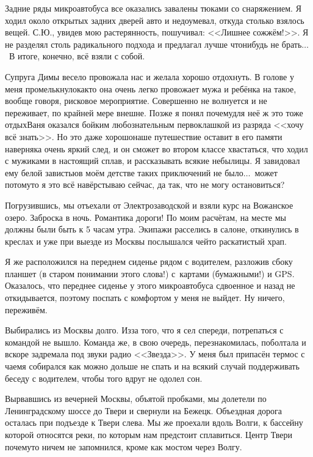 Задние ряды микроавтобуса все оказались завалены тюками со снаряжением. Я ходил около открытых задних дверей авто и недоумевал, откуда столько взялось вещей. С.Ю., увидев мою растерянность, пошучивал:  <<Лишнее сожжём!>>. Я не разделял столь радикального подхода и предлагал лучше что\sdash нибудь не брать$\ldots$~В итоге, конечно, всё взяли с собой.

Супруга Димы весело провожала нас и желала хорошо отдохнуть. В голове у меня промелькнуло\mdash как\sdash то она очень легко провожает мужа и ребёнка на такое, вообще говоря, рисковое мероприятие. Совершенно не волнуется и не переживает, по крайней мере внешне. Позже я понял почему\mdash для неё ж это тоже отдых\mdash Ваня оказался бойким любознательным первоклашкой из разряда <<хочу всё знать>>. Но это даже хорошо\mdash наше путешествие оставит в его памяти наверняка очень яркий след, и он сможет во втором классе хвастаться, что ходил с мужиками в настоящий сплав, и рассказывать всякие небылицы. Я завидовал ему белой завистью\mdash в моём детстве таких приключений не было$\ldots$~может потому\sdash то я это всё навёрстываю сейчас, да так, что не могу остановиться?

Погрузившись, мы отъехали от Электрозаводской и взяли курс на Вожанское озеро. Заброска в ночь. Романтика дороги! По моим расчётам, на месте мы должны были быть к 5 часам утра. Экипажи расселись в салоне, откинулись в креслах и уже при выезде из Москвы послышался чей\sdash то раскатистый храп.

Я же расположился на переднем сиденье рядом с водителем, разложив сбоку планшет (в старом понимании этого слова!) с~картами (бумажными!) и GPS. Оказалось, что переднее сиденье у этого микроавтобуса сдвоенное и назад не откидывается, поэтому поспать с комфортом у меня не выйдет. Ну ничего, переживём. 

Выбирались из Москвы долго. Из\sdash за того, что я сел спереди, потрепаться с командой не вышло. Команда же, в свою очередь, перезнакомилась, поболтала и вскоре задремала под звуки радио <<Звезда>>. У меня был припасён термос с чаем\mdash я собирался как можно дольше не спать и на всякий случай поддерживать беседу с водителем, чтобы того вдруг не одолел сон. 

Вырвавшись из вечерней Москвы, объятой пробками, мы долетели по Ленинградскому шоссе до Твери и свернули на Бежецк. Объездная дорога осталась при подъезде к Твери слева. Мы же проехали вдоль Волги, к бассейну которой относятся реки, по которым нам предстоит сплавиться. Центр Твери почему\sdash то ничем не запомнился, кроме как мостом через Волгу. 

